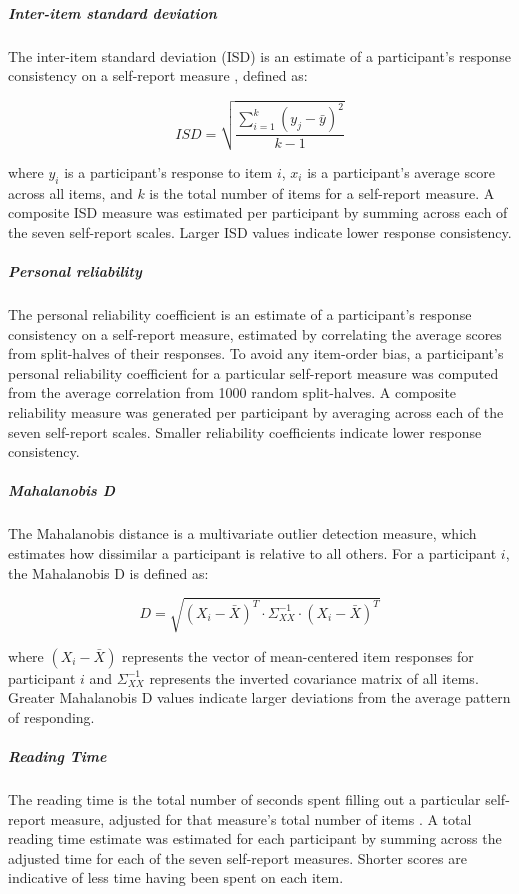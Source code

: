 \documentclass[a4paper,notitlepage,12pt]{article}
\begin{document}
\subparagraph{Inter-item standard deviation} The inter-item standard deviation (ISD) is an estimate of a participant's response consistency on a self-report measure \cite{marjanovic2015inter}, defined as:

\begin{equation*}
    ISD = \sqrt{\frac{\sum^k_{i=1}(y_j - \bar{y})^2}{k-1}}
\end{equation*}

where $y_i$ is a participant's response to item $i$, $x_i$ is a participant's average score across all  items, and $k$ is the total number of items for a self-report measure. A composite ISD measure was estimated per participant by summing across each of the seven self-report scales. Larger ISD values indicate lower response consistency.

\subparagraph{Personal reliability} 

The personal reliability coefficient is an estimate of a participant's response consistency on a self-report measure, estimated by correlating the average scores from split-halves of their responses. To avoid any item-order bias, a participant's personal reliability coefficient for a particular self-report measure was computed from the average correlation from 1000 random split-halves. A composite reliability measure was generated per participant by averaging across each of the seven self-report scales. Smaller reliability coefficients indicate lower response consistency.  
\subparagraph{Mahalanobis D} The Mahalanobis distance is a multivariate outlier detection measure, which estimates how dissimilar a participant is relative to all others. For a participant $i$, the Mahalanobis D is defined as:

\begin{equation*}
    D = \sqrt{(X_i - \bar{X})^T \cdot \Sigma^{-1}_{XX} \cdot (X_i - \bar{X})^T }
\end{equation*}

where $(X_i - \bar{X})$ represents the vector of mean-centered item responses for participant $i$ and $\Sigma^{-1}_{XX}$ represents the inverted covariance matrix of all items. Greater Mahalanobis D values indicate larger deviations from the average pattern of responding.

\subparagraph{Reading Time} The reading time is the total number of seconds spent filling out a particular self-report measure, adjusted for that measure's total number of items \cite{ophir2020turker}. A total reading time estimate was estimated for each participant by summing across the adjusted time for each of the seven self-report measures. Shorter scores are indicative of less time having been spent on each item.
\end{document}
